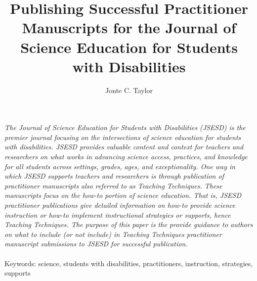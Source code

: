 \documentclass[11.5pt]{sig-alternate} %
\makeatletter
\let\oldabstract\abstract
\let\oldendabstract\endabstract
\renewenvironment{abstract} %
{\renewenvironment{quotation}%
               {\list{}{\addtolength{\leftmargin}{1em} %
                        \listparindent 1.5em%
                        \itemindent    \listparindent%
                        \rightmargin   \leftmargin%
                        \parsep        \z@ \@plus\p@}%
                \item\relax}%
               {\endlist}%
\oldabstract}
{\oldendabstract}
\makeatother
\begin{document}
\title{Publishing Successful Practitioner Manuscripts for the Journal of Science Education for Students with Disabilities}

\author[1]{\large \color{blue}Jonte C. Taylor}


\toappear{}
\maketitle
\begin{@twocolumnfalse} 
\begin{abstract}
\item 
\textit {The Journal of Science Education for Students with Disabilities (JSESD) is the premier journal focusing on the intersections of science education for students with disabilities. JSESD provides valuable content and context for teachers and researchers on what works in advancing science access, practices, and knowledge for all students across settings, grades, ages, and exceptionality. One way in which JSESD supports teachers and researchers is through publication of practitioner manuscripts also referred to as Teaching Techniques. These manuscripts focus on the how-to portion of science education. That is, JSESD practitioner publications give detailed information on how-to provide science instruction or how-to implement instructional strategies or supports, hence Teaching Techniques. The purpose of this paper is the provide guidance to authors on what to include (or not include) in Teaching Techniques practitioner manuscript submissions to JSESD for successful publication.} \\ \\
Keywords: science, students with disabilities, practitioners, instruction, strategies, supports
\end{abstract}
\end{@twocolumnfalse}

\end{document}
